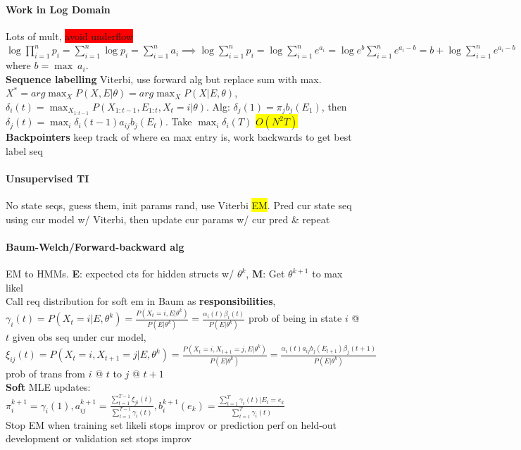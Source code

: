 \paragraph{Work in Log Domain} Lots of mult, \colorbox{red}{avoid
  underflow} $\log \prod_{i=1}^{n} p_i = \sum_{i=1}^n \log p_i =
\sum_{i=1}^n a_i \implies \log \sum_{i=1}^n p_i = \log \sum_{i=1}^n
e^{a_i}=\log e^b \sum_{i=1}^n e^{a_i-b}=b+\log \sum_{i=1}^n e^{a_i-b}$
where $b=\max \ a_i$.
\\ \textbf{Sequence labelling} Viterbi, use forward alg but replace
sum with max. $X^* = arg\max_X P(X,E|\theta)=arg\max_XP(X|E,\theta)$,
$\delta_i(t)=\max_{X_{1:t-1}}P(X_{1:t-1},E_{1:t},X_t = i |
\theta)$. Alg: $\delta_j(1)=\pi_jb_j(E_1)$, then
$\delta_j(t)=\max_i\delta_i(t-1)a_{ij}b_{j}(E_t)$. Take $\max_i
\delta_i(T)$ \colorbox{yellow}{$O(N^2T)$}
\textbf{Backpointers} keep track of where ea max entry is,
work backwards to get best label seq 
\paragraph{Unsupervised TI} No state seqs, guess them, init params
rand, use Viterbi \colorbox{yellow}{EM}. Pred cur state seq using cur
model w/ Viterbi, then update cur params w/ cur pred \& repeat
\paragraph{Baum-Welch/Forward-backward alg} EM to HMMs. \textbf{E}:
expected cts for hidden structs w/ $\theta^k$, \textbf{M}: Get
$\theta^{k+1}$ to max likel
\\ Call req distribution for soft em in Baum as
\textbf{responsibilities}, $\gamma_i(t) = P(X_t = i | E,
\theta^k)=\frac{P(X_t = i, E |
  \theta^k)}{P(E|\theta^k)}=\frac{\alpha_i(t)\beta_i(t)}{P(E|\theta^k)}$
prob of being in state $i$ @ $t$ given obs seq under cur model,$
\xi_{ij}(t)=P(X_t=i,X_{t+1}=j|E,\theta^k)=\frac{P(X_t = i, X_{t+1}=j,
  E|\theta^k)}{P(E|\theta^k)}=\frac{\alpha_i(t)a_{ij}b_j(E_{t+1})\beta_j(t+1)}{P(E|\theta^k)}$
prob of trans from $i$ @ $t$ to $j$ @ $t+1$
\\ \textbf{Soft} MLE updates: $\pi_i^{k+1}=\gamma_i(1),
a_{ij}^{k+1}=\frac{\sum_{t=1}^{T-1}\xi_{ji}(t)}{\sum_{t=1}^{T-1}\gamma_i(t)},b_i^{k+1}(e_k)=\frac{\sum_{t=1}^T\gamma_i(t)|E_t
  = e_k}{\sum_{t=1}^T \gamma_i (t)}$
\\ Stop EM when training set likeli stops improv or prediction perf on
held-out development or validation set stops improv
